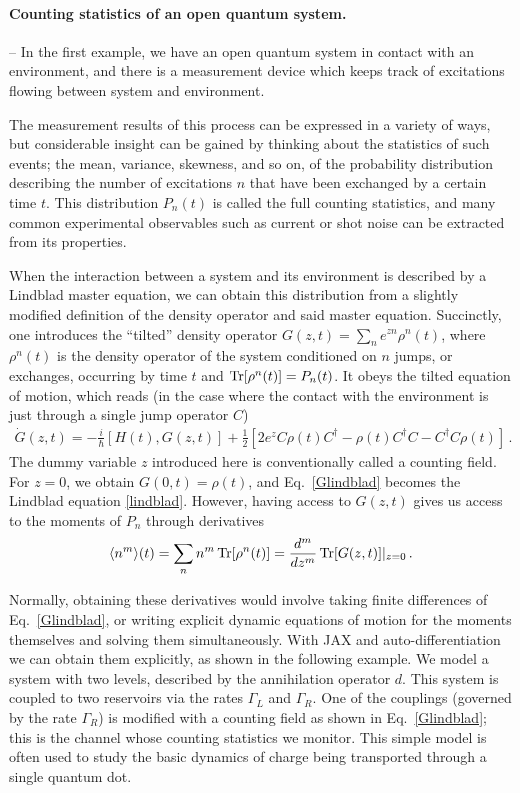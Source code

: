 \documentclass[preprint,3p,sort&compress]{elsarticle}
\begin{document}
\paragraph{Counting statistics of an open quantum system.} -- In the first example, we have an open quantum system in contact with an environment, and there is a measurement device which keeps track of excitations flowing between system and environment.  

The measurement results of this process can be expressed in a variety of ways, but considerable insight can be gained by thinking about the statistics of such events; the mean, variance, skewness, and so on, of the probability distribution describing the number of excitations $n$ that have been exchanged by a certain time $t$. This distribution $P_n(t)$ is called the full counting statistics, and many common experimental observables such as current or shot noise can be extracted from its properties.

When the interaction between a system and its environment is described by a Lindblad master equation, we can obtain this distribution from a slightly modified definition of the density operator and said master equation.  Succinctly, one introduces the ``tilted'' density operator $G(z,t) = \sum_n e^{z n} \rho^{n}(t)$, where $ \rho^{n}(t)$ is the density operator of the system conditioned on $n$ jumps, or exchanges, occurring by time $t$ and $\Tr[ \rho^{n}(t)] = P_n(t)$. It obeys the tilted equation of motion, which reads (in the case where the contact with the environment is just through a single jump operator $C$)
\begin{align}\label{Glindblad}
\dot G(z,t) = -\frac{i}{\hbar}[H(t),G(z,t)] + \frac{1}{2} \left[2 e^{z} C \rho(t) C^\dagger - \rho(t) C^\dagger C - C^\dagger C \rho(t)\right]\, .
\end{align}
The dummy variable $z$ introduced here is conventionally called a counting field.
For $z=0$, we obtain $G(0,t)=\rho(t)$, and Eq.~\eqref{Glindblad} becomes the Lindblad equation \eqref{lindblad}. However, having access to $G(z,t)$ gives us access to the moments of $P_n$ through derivatives
\begin{equation}
\langle n^{m}\rangle(t) = \sum_n n^{m} \Tr[\rho^{n}(t)]=\frac{d^m}{dz^m}\Tr[G(z,t)]|_{z=0} \, .
\end{equation}

Normally, obtaining these derivatives would involve taking finite differences of Eq.~\eqref{Glindblad},  or writing explicit dynamic equations of motion for the moments themselves and solving them simultaneously.  With JAX and auto-differentiation we can obtain them explicitly, as shown in the following example.
We model a system with two levels, described by the annihilation operator $d$.  This system is coupled to two reservoirs via the rates $\Gamma_L$ and $\Gamma_R$. One of the couplings (governed by the rate $\Gamma_R$) is modified with a counting field as shown in Eq.~\eqref{Glindblad}; this is the channel whose counting statistics we monitor.  This simple model is often used to study the basic dynamics of charge being transported through a single quantum dot.
\newpage
{}
\end{document}
